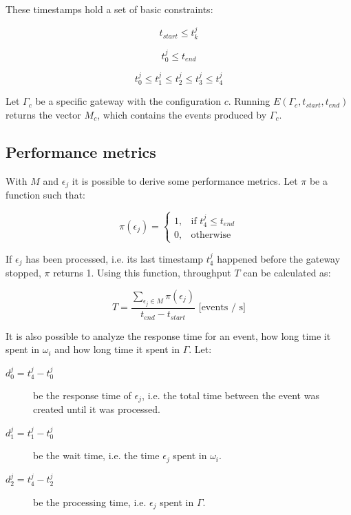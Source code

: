 These timestamps hold a set of basic constraints:

\begin{equation}
t_{start} \leq t_k^j
\end{equation}

\begin{equation} \label{eq:t_0}
t_0^j \leq t_{end}
\end{equation}

\begin{equation}
t_0^j \leq t_1^j \leq t_2^j \leq t_3^j \leq t_4^j
\end{equation}

Let $\Gamma_c$ be a specific gateway with the configuration $c$.  Running
$E(\Gamma_c, t_{start}, t_{end})$ returns the vector $M_c$, which contains the
events produced by $\Gamma_c$.

\subsection{Performance metrics}
\label{sec:performance_metrics}

With $M$ and $\epsilon_j$ it is possible to derive some performance metrics.
Let $\pi$ be a function such that:

\[
    \pi(\epsilon_j) =
\begin{cases}
    1, & \text{if } t_4^j \leq t_{end} \\
    0, & \text{otherwise}
\end{cases}
\]

If $\epsilon_j$ has been processed, i.e. its last timestamp $t_4^j$ happened
before the gateway stopped, $\pi$ returns 1. Using this function, throughput
$T$ can be calculated as:

$$
T = \frac{\sum_{\epsilon_j \in M}{\pi(\epsilon_j)}}{t_{end} - t_{start}}
\text{ [events / s]}
$$

It is also possible to analyze the response time for an event, how long time it
spent in $\omega_i$ and how long time it spent in $\Gamma$. Let:

\begin{description}

    \item[$d_0^j = t_4^j - t_0^j$] be the response time of $\epsilon_j$, i.e. the
        total time between the event was created until it was processed.

    \item[$d_1^j = t_1^j - t_0^j$] be the wait time, i.e. the time $\epsilon_j$
        spent in $\omega_i$.

    \item[$d_2^j = t_4^j - t_2^j$] be the processing time, i.e. $\epsilon_j$ spent
        in $\Gamma$.

\end{description}


